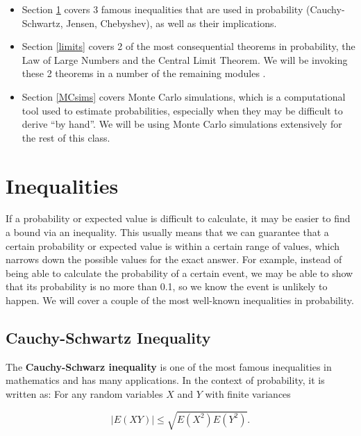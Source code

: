 \documentclass[
]{book}
\providecommand{\tightlist}{%
  \setlength{\itemsep}{0pt}\setlength{\parskip}{0pt}}
\begin{document}
\begin{itemize}
\tightlist
\item
  Section \ref{inequalities} covers 3 famous inequalities that are used in probability (Cauchy-Schwartz, Jensen, Chebyshev), as well as their implications.
\item
  Section \ref{limits} covers 2 of the most consequential theorems in probability, the Law of Large Numbers and the Central Limit Theorem. We will be invoking these 2 theorems in a number of the remaining modules .
\item
  Section \ref{MCsims} covers Monte Carlo simulations, which is a computational tool used to estimate probabilities, especially when they may be difficult to derive ``by hand''. We will be using Monte Carlo simulations extensively for the rest of this class.
\end{itemize}

\hypertarget{inequalities}{%
\section{Inequalities}\label{inequalities}}

If a probability or expected value is difficult to calculate, it may be easier to find a bound via an inequality. This usually means that we can guarantee that a certain probability or expected value is within a certain range of values, which narrows down the possible values for the exact answer. For example, instead of being able to calculate the probability of a certain event, we may be able to show that its probability is no more than 0.1, so we know the event is unlikely to happen. We will cover a couple of the most well-known inequalities in probability.

\hypertarget{cauchy-schwartz-inequality}{%
\subsection{Cauchy-Schwartz Inequality}\label{cauchy-schwartz-inequality}}

The \textbf{Cauchy-Schwarz inequality} is one of the most famous inequalities in mathematics and has many applications. In the context of probability, it is written as: For any random variables \(X\) and \(Y\) with finite variances

\begin{equation} 
|E(XY)| \leq \sqrt{E(X^2)E(Y^2)}.
\label{eq:6-CS}
\end{equation}
\end{document}
